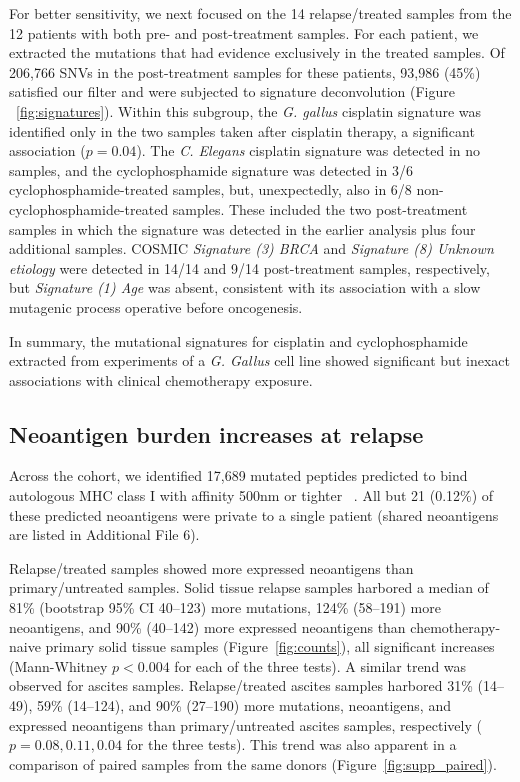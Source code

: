 For better sensitivity, we next focused on the 14 relapse/treated samples from the 12 patients with both pre- and post-treatment samples. For each patient, we extracted the mutations that had evidence exclusively in the treated samples. Of 206,766 SNVs in the post-treatment samples for these patients, 93,986 (45\%) satisfied our filter and were subjected to signature deconvolution (Figure ~\ref{fig:signatures}). Within this subgroup, the \textit{G. gallus} cisplatin signature was identified only in the two samples taken after cisplatin therapy, a significant association ($p = 0.04$). The \textit{C. Elegans} cisplatin signature was detected in no samples, and the cyclophosphamide signature was detected in 3/6 cyclophosphamide-treated samples, but, unexpectedly, also in 6/8 non-cyclophosphamide-treated samples. These included the two post-treatment samples in which the signature was detected in the earlier analysis plus four additional samples. COSMIC \textit{Signature (3) BRCA} and \textit{Signature (8) Unknown etiology} were detected in 14/14 and 9/14 post-treatment samples, respectively, but \textit{Signature (1) Age} was absent, consistent with its association with a slow mutagenic process operative before oncogenesis.

In summary, the mutational signatures for cisplatin and cyclophosphamide extracted from experiments of a \textit{G. Gallus} cell line showed significant but inexact associations with clinical chemotherapy exposure.

\subsection*{Neoantigen burden increases at relapse}
Across the cohort, we identified 17,689 mutated peptides predicted to bind autologous MHC class I with affinity 500nm or tighter ~\cite{Sette1994}. All but 21 (0.12\%) of these predicted neoantigens were private to a single patient (shared neoantigens are listed in Additional File 6).

Relapse/treated samples showed more expressed neoantigens than primary/untreated samples. Solid tissue relapse samples harbored a median of 81\% (bootstrap 95\% CI 40--123) more mutations, 124\% (58--191) more neoantigens, and 90\% (40--142) more expressed neoantigens than chemotherapy-naive primary solid tissue samples (Figure~\ref{fig:counts}), all significant increases (Mann-Whitney $p < 0.004$ for each of the three tests). A similar trend was observed for ascites samples. Relapse/treated ascites samples harbored 31\% (14--49), 59\% (14--124), and 90\% (27--190) more mutations, neoantigens, and expressed neoantigens than primary/untreated ascites samples, respectively ($p=0.08, 0.11, 0.04$ for the three tests). This trend was also apparent in a comparison of paired samples from the same donors (Figure~\ref{fig:supp_paired}). 

